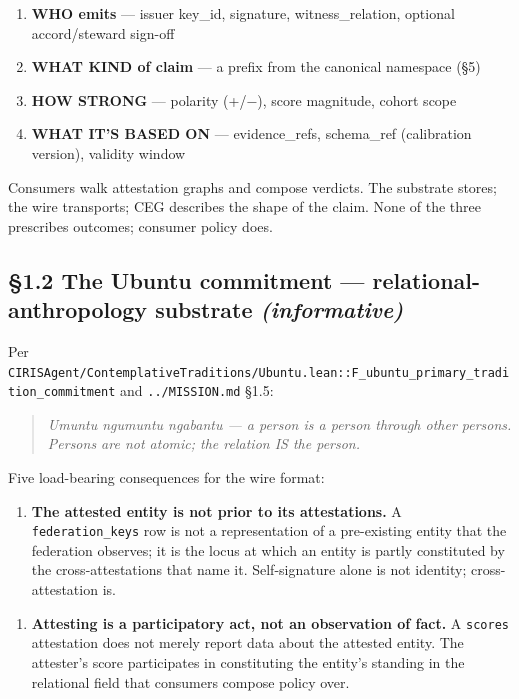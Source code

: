 \documentclass[11pt]{article}
\begin{document}
\begin{enumerate}\setlength\itemsep{0pt}
\item \textbf{WHO emits} — issuer key\_id, signature, witness\_relation, optional accord/steward sign-off
\item \textbf{WHAT KIND of claim} — a prefix from the canonical namespace (§5)
\item \textbf{HOW STRONG} — polarity (+/−), score magnitude, cohort scope
\item \textbf{WHAT IT'S BASED ON} — evidence\_refs, schema\_ref (calibration version), validity window
\end{enumerate}


Consumers walk attestation graphs and compose verdicts. The substrate stores; the wire transports; CEG describes the shape of the claim. None of the three prescribes outcomes; consumer policy does.


\subsection*{§1.2 The Ubuntu commitment — relational-anthropology substrate \textit{(informative)}}



Per \texttt{CIRISAgent/ContemplativeTraditions/Ubuntu.lean::F\_ubuntu\_primary\_tradition\_commitment} and \texttt{../MISSION.md} §1.5:


\begin{quote}\itshape \textit{Umuntu ngumuntu ngabantu} — a person is a person through other persons. Persons are not atomic; the relation IS the person.\end{quote}


Five load-bearing consequences for the wire format:


\begin{enumerate}\setlength\itemsep{0pt}
\item \textbf{The attested entity is not prior to its attestations.} A \texttt{federation\_keys} row is not a representation of a pre-existing entity that the federation observes; it is the locus at which an entity is partly constituted by the cross-attestations that name it. Self-signature alone is not identity; cross-attestation is.
\end{enumerate}


\begin{enumerate}\setlength\itemsep{0pt}
\item \textbf{Attesting is a participatory act, not an observation of fact.} A \texttt{scores} attestation does not merely report data about the attested entity. The attester's score participates in constituting the entity's standing in the relational field that consumers compose policy over.
\end{enumerate}
\end{document}
